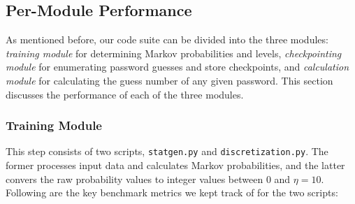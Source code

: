 \documentclass{article} %
\theoremstyle{definition}
\theoremstyle{theorem}
\theoremstyle{remark}
\theoremstyle{remark}
\begin{document}
\subsection{Per-Module Performance}
\par\quad As mentioned before, our code suite can be divided into the three modules: \emph{training module} for determining Markov probabilities and levels, \emph{checkpointing module} for enumerating password guesses and store checkpoints, and \emph{calculation module} for calculating the guess number of any given password. This section discusses the performance of each of the three modules.

\subsubsection{Training Module}
\par\quad This step consists of two scripts, \texttt{statgen.py} and \texttt{discretization.py}. The former processes input data and calculates Markov probabilities, and the latter convers the raw probability values to integer values between $0$ and $\eta = 10$. Following are the key benchmark metrics we kept track of for the two scripts:
\end{document}
